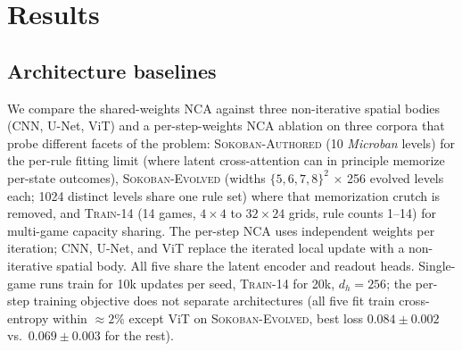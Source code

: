 \section{Results}
\label{sec:results}


\subsection{Architecture baselines}
\label{sec:results-baselines}
\label{sec:results-multigame}

We compare the shared-weights NCA against three non-iterative spatial
bodies (CNN, U-Net, ViT) and a per-step-weights NCA ablation on three
corpora that probe different facets of the problem:
\textsc{Sokoban-Authored} (10 \textit{Microban} levels) for the
per-rule fitting limit (where latent cross-attention can in principle
memorize per-state outcomes), \textsc{Sokoban-Evolved} (widths
$\{5,6,7,8\}^2$ $\times$ 256 evolved levels each; 1024 distinct levels
share one rule set) where that memorization crutch is removed, and
\textsc{Train-14} (14 games, $4{\times}4$ to $32{\times}24$ grids,
rule counts 1--14) for multi-game capacity sharing.
The per-step NCA uses independent weights per iteration; CNN, U-Net,
and ViT replace the iterated local update with a non-iterative spatial
body.
All five share the latent encoder and readout heads.
Single-game runs train for 10k updates per seed, \textsc{Train-14} for
20k, $d_h=256$; the per-step training objective does not separate
architectures (all five fit train cross-entropy within $\approx 2\%$
except ViT on \textsc{Sokoban-Evolved}, best loss $0.084 \pm 0.002$
vs.\ $0.069 \pm 0.003$ for the rest).

\begin{table}[t]
  \centering
  \caption{\textbf{Architecture baselines across three corpora.}
    BFS-AR cell-error (mean $\pm$ std over 3 seeds), per-cell,
    averaged across rollout steps and aggregated across games/levels;
    lower is better. Architectures sorted by \textsc{Train-14} BFS-AR
    ascending; per-column BFS winner and fewest parameters bolded.
    Params (M) are from the \textsc{Train-14} row; the per-preset
    drift and the random-AR / one-step (TF) columns are reported in
    Table~\ref{tab:baselines-arch-full} (Appendix~\ref{app:baselines-full}).}
  \label{tab:baselines-arch}
  \small
  \resizebox{\linewidth}{!}{%
  }
\end{table}

